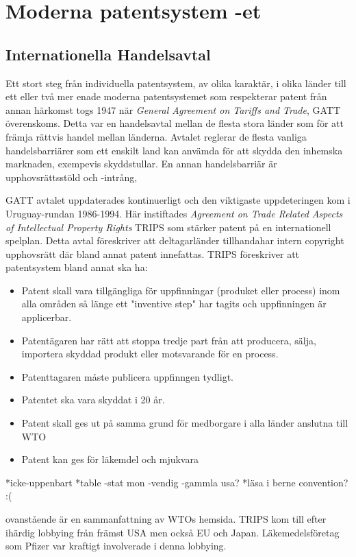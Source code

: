 \section{Moderna patentsystem -et}

\subsection{Internationella Handelsavtal}
Ett stort steg från individuella patentsystem, av olika karaktär, i olika länder till ett eller två mer enade moderna patentsystemet som respekterar patent från annan härkomst togs 1947 när \emph{General Agreement on Tariffs and Trade}, GATT överenskoms. Detta var en handelsavtal mellan de flesta stora länder som för att främja rättvis handel mellan länderna. \cite{gatt} Avtalet reglerar de flesta vanliga handelsbarriärer som ett enskilt land kan anvämda för att skydda den inhemska marknaden, exempevis skyddstullar. En annan handelsbarriär är upphovsrättsstöld och -intrång, 

GATT avtalet uppdaterades kontinuerligt och den viktigaste uppdeteringen kom i Uruguay-rundan 1986-1994. Här instiftades \emph{Agreement on Trade Related Aspects of Intellectual Property Rights} TRIPS som stärker patent på en internationell spelplan. Detta avtal föreskriver att deltagarländer tillhandahar intern copyright upphovsrätt där bland annat patent innefattas. TRIPS föreskriver att patentsystem bland annat ska ha:

\begin{itemize}
	\item Patent skall vara tillgängliga för uppfinningar (produket eller process) inom alla områden så länge ett "inventive step" har tagits och uppfinningen är applicerbar.
	\item Patentägaren har rätt att stoppa tredje part från att producera, sälja, importera skyddad produkt eller motsvarande för en process.
	\item Patenttagaren måste publicera uppfinngen tydligt.
	\item Patentet ska vara skyddat i 20 år.
	\item Patent skall ges ut på samma grund för medborgare i alla länder anslutna till WTO
	\item Patent kan ges för läkemdel och mjukvara
\end{itemize}	
*icke-uppenbart
*table -stat mon -vendig -gammla usa? 
*läsa i berne convention? :(

ovanstående är en sammanfattning av WTOs hemsida\cite{wto}. TRIPS kom till efter ihärdig lobbying från främst USA\cite{drahos} men också EU och Japan. Läkemedelsföretag som Pfizer var kraftigt involverade i denna lobbying\cite{drahos}.


